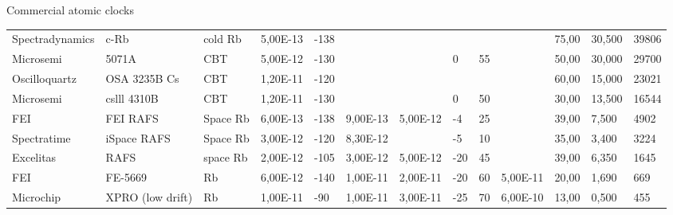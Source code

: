 \begin{frame}{Commercial atomic clocks}
\begin{table}
{\begin{tabular}{ll|lllllllllll}
                Spectradynamics & c-Rb             & cold Rb       & 5,00E-13      & -138                   & ~              & ~                & ~                      & ~                      & ~               & 75,00          & 30,500          & 39806                   \\
                Microsemi       & 5071A            & CBT           & 5,00E-12      & -130                   & ~              & ~                & 0                      & 55                     & ~               & 50,00          & 30,000          & 29700                   \\
                Oscilloquartz   & OSA 3235B Cs     & CBT           & 1,20E-11      & -120                   & ~              & ~                & ~                      & ~                      & ~               & 60,00          & 15,000          & 23021                   \\
                Microsemi       & cslll 4310B      & CBT           & 1,20E-11      & -130                   & ~              & ~                & 0                      & 50                     & ~               & 30,00          & 13,500          & 16544                   \\
                FEI             & FEI RAFS         & Space Rb      & 6,00E-13      & -138                   & 9,00E-13       & 5,00E-12         & -4                     & 25                     & ~               & 39,00          & 7,500           & 4902                    \\
                Spectratime     & iSpace RAFS      & Space Rb      & 3,00E-12      & -120                   & 8,30E-12       & ~                & -5                     & 10                     & ~               & 35,00          & 3,400           & 3224                    \\
                Excelitas       & RAFS             & space Rb      & 2,00E-12      & -105                   & 3,00E-12       & 5,00E-12         & -20                    & 45                     & ~               & 39,00          & 6,350           & 1645                    \\
                FEI             & FE-5669          & Rb            & 6,00E-12      & -140                   & 1,00E-11       & 2,00E-11         & -20                    & 60                     & 5,00E-11        & 20,00          & 1,690           & 669                     \\
                Microchip       & XPRO (low drift) & Rb            & 1,00E-11      & -90                    & 1,00E-11       & 3,00E-11         & -25                    & 70                     & 6,00E-10        & 13,00          & 0,500           & 455                     \\

\end{tabular}}
\end{table}
\end{frame}
